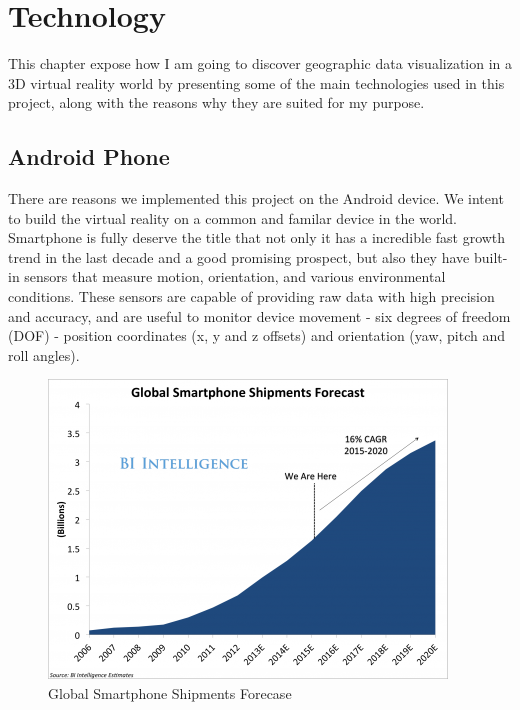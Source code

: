 \label{chapter-technology}
\chapter{Technology}

This chapter expose how I am going to discover geographic data visualization in a 3D virtual reality world by presenting some of the main technologies used in this project, along with the reasons why they are suited for my purpose.

\section{Android Phone}

There are reasons we implemented this project on the Android device. We intent to build the virtual reality on a common and familar device in the world. Smartphone is fully deserve the title that not only it has a incredible fast growth trend in the last decade and a good promising prospect, but also they have built-in sensors that measure motion, orientation, and various environmental conditions. These sensors are capable of providing raw data with high precision and accuracy, and are useful to monitor device movement - six degrees of freedom (DOF) - position coordinates (x, y and z offsets) and orientation (yaw, pitch and roll angles).

\begin{figure}[H]
\caption[smartphone-shipments-forecast]{Global Smartphone Shipments Forecase \parencite{td.global-smartphone-market.2015}}
\label{fig:smartphone-shipments-forecast}
\centering
\includegraphics[width=\linewidth]{Figures/smartphone-shipments-forecast.png}
\decoRule
\end{figure}

